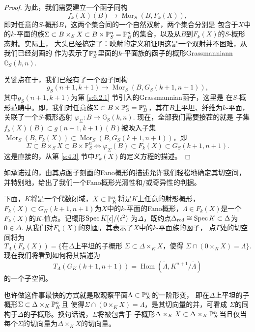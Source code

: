 \begin{proof}
为此，我们需要建立一个函子同构
\[
    f_{k}(X)(B) \longrightarrow \operatorname{Mor}_{S}(B, F_{k}(X)),
\]
即对任意的$S$-概形$B$，这两个集合间的一个自然双射，两个集合分别是
包含于$X$中的$k$-平面的族$\Sigma\subset B\times_S X\subset B\times 
\P_S^n=\P_B^n$的集合，以及从$B$到$F_k(X)$的$S$-概形态射。实际上，
大头已经搞定了：映射的定义和证明这是一个双射并不困难，从我们已经刻画的
作为表示了$\P_S^n$里面的$k$-平面族的函子的概形Grassmanniann 
$\mathbb G_S(k,n)$.

关键点在于，我们已经有了一个函子同构
\[
    g_{S}(n+1, k+1) \longrightarrow \operatorname{Mor}_{S}
    (B, G_{S}(k+1, n+1)),
\]
其中$g_S(n+1,k+1)$为第 \ref{s:6.2.1} 节引入的Grassmannian函子，这里是
在$S$-概形范畴中。即，我们对任意族$\Sigma\subset B\times \P_S^n
=\P_B^n$，其在$B$上平坦、纤维为$k$-平面，关联了一个$S$-概形态射
$\varphi_\Sigma:B\to \mathbb G_S(k,n)$. 现在，全部我们需要接茬的就是
子集$f_k(X)(B)\subset g(n+1,k+1)(B)$被映入子集$\operatorname{Mor}_S(B,
F_k(X))\subset \operatorname{Mor}_S(B,G_S(k+1,n+1))$，即
\[
    \Sigma \subset B \times_{S} X \subset B \times \mathbb{P}_{S}^{n} \Longleftrightarrow 
    \varphi_{\Sigma}(B) \subset F_{k}(X) \subset G_{S}(k+1, n+1).
\]
这是直接的，从第 \ref{s:4.3} 节中$F_k(X)$的定义方程的描述。
\end{proof}

如承诺过的，由其点函子刻画的Fano概形的描述允许我们轻松地确定其切空间，
并特别地，给出了我们一个Fano概形光滑性和/或奇异性的判据。

下面，$K$将是一个代数闭域，$X\subset \P_K^n$将是$K$上任意的射影概形，
$F_k(X)\subset G_K(k+1,n+1)$为$X$中的$k$-平面的Fano概形，$\Lambda\in
F_k(X)$是一个$F_k(X)$的$K$-值点。记概形$\spec K[\epsilon]/(\epsilon^2)$
为$\Delta$，既约点$\Delta_{\text{red}}\cong \spec K\subset \Delta$为
$0\in \Delta$. 从我们对$F_k(X)$的刻画，其表示了$X$中的$k$-平面族的函子，
点$\Gamma$处的切空间将为
\[
    T_\Lambda(F_k(X))=\{\text{在$\Delta$上平坦的子概形
    $\Sigma\subset \Delta\times_K X$，使得
    $\Sigma\cap (0\times_K X)=\Lambda$}\}.
\]
现在我们将看到如何将其描述为
\[
    T_{\Lambda}(G_{K}(k+1, n+1))=\operatorname{Hom}
    (\tilde{\Lambda}, K^{n+1} / \tilde{\Lambda})
\]
的一个子空间。

也许做这件事最快的方式就是取观察平面$\Lambda\subset \P_K^n$的一阶形变，
即在$\Delta$上平坦的子概形$\Sigma\subset \Delta\times_K \P_K^n$且
使得$\Sigma\cap (0\times_K X)=\Lambda$，是其切向量的并，可看成
$\Sigma$的同构于$\Delta$的子概形。换句话说，$\Sigma$将被包含于
子概形$\Delta\times_K X\subset \Delta\times_K \P_K^n$当且仅当
每个$\Sigma$的切向量为$\Delta\times_K X$的切向量。

